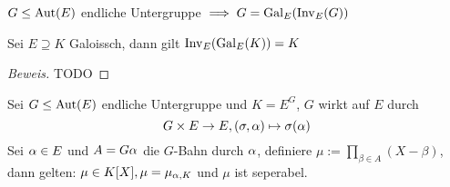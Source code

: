 \documentclass[a4paper]{report}
\begin{document}
\begin{kor}
$G \le \operatorname{Aut}(E)$ endliche Untergruppe $\implies G = \operatorname{Gal}_{E}(\operatorname{Inv}_{E}(G))$
\end{kor}
\begin{kor}
Sei $E \supseteq K$ Galoissch, dann gilt $\operatorname{Inv}_{E}(\operatorname{Gal}_{E}(K)) = K$
\begin{proof}[Beweis]
TODO
\end{proof}
\end{kor}

\begin{ubng}
  Sei $G \le \operatorname{Aut}(E)$ endliche Untergruppe und $K = E^{G}$, $G$ wirkt auf $E$ durch
  \[G \times E \to E, (\sigma, \alpha) \mapsto \sigma(\alpha)\]
  Sei $\alpha \in E$ und $A = G\alpha$ die $G$-Bahn durch $\alpha$, definiere $\mu:= \prod_{\beta \in A}(X-\beta)$, dann gelten: $\mu \in K[X], \mu = \mu_{\alpha, K}$ und $\mu$ ist seperabel.
\end{ubng}
\end{document}
